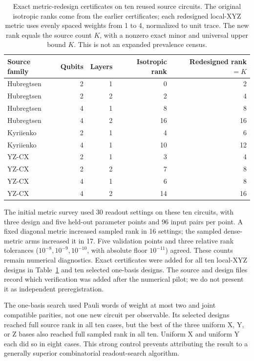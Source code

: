 \begin{table}[h]
\centering
\caption{Exact metric-redesign certificates on ten reused source
circuits. The original isotropic ranks come from the earlier
certificates; each redesigned local-XYZ metric uses evenly spaced
weights from 1 to 4, normalized to unit trace. The new rank equals
the source count $K$, with a nonzero exact minor and universal upper
bound $K$. This is not an expanded prevalence census.}
\label{tab:metricexactall}
\begin{tabular}{lrrrr}
\toprule
Source family & Qubits & Layers & Isotropic rank & Redesigned rank $=K$\\
\midrule
Hubregtsen & 2 & 1 & 0 & 2\\
Hubregtsen & 2 & 2 & 2 & 4\\
Hubregtsen & 4 & 1 & 8 & 8\\
Hubregtsen & 4 & 2 & 16 & 16\\
Kyriienko & 2 & 1 & 4 & 6\\
Kyriienko & 4 & 1 & 10 & 12\\
YZ-CX & 2 & 1 & 3 & 4\\
YZ-CX & 2 & 2 & 7 & 8\\
YZ-CX & 4 & 1 & 6 & 8\\
YZ-CX & 4 & 2 & 14 & 16\\
\bottomrule
\end{tabular}
\end{table}

The initial metric survey used 30 readout settings on these ten
circuits, with three design and five held-out parameter points and
96 input pairs per point. A fixed diagonal metric increased sampled
rank in 16 settings; the sampled dense-metric arms increased it in
17. Five validation points and three relative rank tolerances
($10^{-8},10^{-9},10^{-10}$, with absolute floor $10^{-11}$)
agreed. These counts remain numerical diagnostics. Exact certificates
were added for all ten local-XYZ designs in
Table~\ref{tab:metricexactall} and ten selected one-basis designs.
The source and design files record which verification was added after
the numerical pilot; we do not present it as independent preregistration.

The one-basis search used Pauli words of weight at most two and
joint compatible parities, not one new circuit per observable.
Its selected designs reached full source rank in all ten cases,
but the best of the three uniform X, Y, or Z bases also reached
full sampled rank in all ten. Uniform X and uniform Y each did so
in eight cases. This strong control prevents attributing the result
to a generally superior combinatorial readout-search algorithm.


